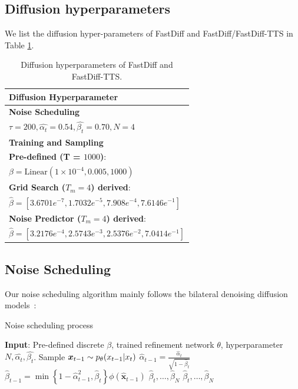 \subsection{Diffusion hyperparameters} \label{appendix:noise_schedule}
We list the diffusion hyper-parameters of FastDiff and FastDiff/FastDiff-TTS in Table \ref{tab:apx_diffusionhyperparameters}. 


\begin{table}[h]
    \small
    \centering
    \begin{tabular}{l}
    \hline
    \textbf{Diffusion Hyperparameter}       \\
    \toprule 
    \textbf{Noise Scheduling}                \\
    $\tau = 200, \hat{\alpha_{t}} = 0.54, \hat{\beta_{t}} = 0.70, N = 4$                                            \\  
    \midrule
    \textbf{Training and Sampling}                            \\
    \textbf{Pre-defined (T = $1000$)}: \\ $\beta= \text{Linear} (1\times 10^{-4}, 0.005, 1000)$       \\
    \textbf{Grid Search ($T_m = 4$) derived}:  \\ $ \hat{\beta} = [3.6701e^{-7}, 1.7032e^{-5}, 7.908e^{-4}, 7.6146e^{-1}]$      \\
    \textbf{Noise Predictor ($T_m = 4$) derived}: \\ $ \hat{\beta} = [3.2176e^{-4}, 2.5743e^{-3}, 2.5376e^{-2}, 7.0414e^{-1}]$      \\
    \bottomrule
    \end{tabular}
    \caption{Diffusion hyperparameters of FastDiff and FastDiff-TTS.}
    \label{tab:apx_diffusionhyperparameters}
    \end{table}


\subsection{Noise Scheduling}  \label{appendix:algorithm}
Our noise scheduling algorithm mainly follows the bilateral denoising diffusion models~\cite{lam2022bddm}:
\begin{algorithm}[H]
    \centering
    \caption{Noise scheduling process}\label{alg: noise scheduling}
    \begin{algorithmic}[1]
    \STATE  \textbf{Input}: Pre-defined discrete $\beta$, trained refinement network $\theta$, hyperparameter $N, \hat{\alpha_{t}}, \hat{\beta_{t}}$.
    \STATE Sample ${\bm{x}}_{t-1}\sim p_{\theta}(x_{t-1}|x_t)$
    \STATE  $\hat{\alpha}_{t-1}=\frac{\hat{\alpha}_{t}}{\sqrt{1-\hat{\beta}_{t}}}$
    \STATE  $\hat{\beta}_{t-1}=\min \left\{1-\hat{\alpha}_{t-1}^{2}, \hat{\beta}_{t}\right\} \phi\left(\hat{\boldsymbol{x}}_{t-1}\right)$
    \RETURN $\hat{\beta}_{t}, \ldots, \hat{\beta}_{N}$
    \ENDIF
    \ENDFOR
    \RETURN $\hat{\beta}_{t}, \ldots, \hat{\beta}_{N}$
    \vspace{0.09em}
    \end{algorithmic}
\end{algorithm}

